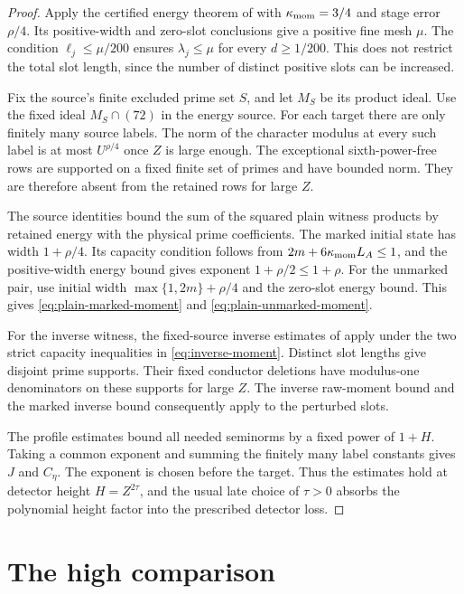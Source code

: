 \documentclass[11pt]{article}
\begin{document}
\begin{proof}
Apply the certified energy theorem of \cite{OAI} with $\kappa_{\rm mom}=3/4$ and
stage error $\rho/4$. Its positive-width and zero-slot conclusions give a
positive fine mesh $\mu$. The condition $\ell_j\le\mu/200$ ensures
$\lambda_j\le\mu$ for every $d\ge1/200$. This does not restrict the total
slot length, since the number of distinct positive slots can be increased.

Fix the source's finite excluded prime set $S$, and let $M_S$ be its
product ideal. Use the fixed ideal $M_S\cap(72)$ in the energy source.
For each target there are only finitely many source labels. The norm of
the character modulus at every such label is at most $U^{\rho/4}$ once $Z$ is large
enough. The exceptional sixth-power-free rows are supported on a fixed
finite set of primes and have bounded norm. They are therefore absent
from the retained rows for large $Z$.

The source identities bound the sum of the squared plain witness products
by retained energy with the physical prime coefficients. The marked initial state
has width $1+\rho/4$. Its capacity condition follows from
$2m+6\kappa_{\rm mom}L_A\le1$, and the positive-width energy bound gives exponent
$1+\rho/2\le1+\rho$. For the unmarked pair, use initial width
$\max\{1,2m\}+\rho/4$ and the zero-slot energy bound. This gives
\eqref{eq:plain-marked-moment} and \eqref{eq:plain-unmarked-moment}.

For the inverse witness, the fixed-source inverse estimates of \cite{OAI}
apply under the two strict capacity inequalities in
\eqref{eq:inverse-moment}. Distinct slot lengths give disjoint prime
supports. Their fixed conductor deletions have modulus-one denominators
on these supports for large $Z$. The inverse raw-moment bound and the
marked inverse bound consequently apply to the perturbed slots.

The profile estimates bound all needed seminorms by a fixed power of
$1+H$. Taking a common exponent and summing the finitely many label
constants gives $J$ and $C_\eta$. The exponent is chosen before the
target. Thus the estimates hold at detector height $H=Z^{2\tau}$, and
the usual late choice of $\tau>0$ absorbs the polynomial height factor
into the prescribed detector loss.
\end{proof}

\section{The high comparison}\label{sec:high}
\end{document}
